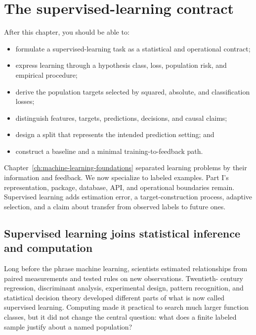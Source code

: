 \chapter{The supervised-learning contract}
\label{ch:supervised-contract}

\begin{learningobjectives}
After this chapter, you should be able to:
\begin{itemize}
  \item formulate a supervised-learning task as a statistical and operational contract;
  \item express learning through a hypothesis class, loss, population risk, and
  empirical procedure;
  \item derive the population targets selected by squared, absolute, and
  classification losses;
  \item distinguish features, targets, predictions, decisions, and causal claims;
  \item design a split that represents the intended prediction setting; and
  \item construct a baseline and a minimal training-to-feedback path.
\end{itemize}
\end{learningobjectives}

\begin{chapterconnection}
Chapter~\ref{ch:machine-learning-foundations} separated learning problems by
their information and feedback. We now specialize to labeled examples. Part I's
representation, package, database, API, and operational boundaries remain.
Supervised learning adds estimation error, a target-construction process,
adaptive selection, and a claim about transfer from observed labels to future
ones.
\end{chapterconnection}

\section{Supervised learning joins statistical inference and computation}

Long before the phrase machine learning, scientists estimated relationships
from paired measurements and tested rules on new observations. Twentieth-
century regression, discriminant analysis, experimental design, pattern
recognition, and statistical decision theory developed different parts of what
is now called supervised learning. Computing made it practical to search much
larger function classes, but it did not change the central question: what does a
finite labeled sample justify about a named population?


